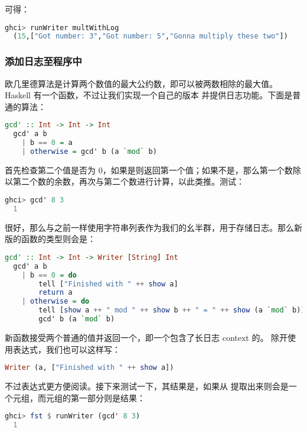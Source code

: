 \documentclass[./main.tex]{subfiles}
\begin{document}
可得：

\begin{lstlisting}[language=Haskell]
  ghci> runWriter multWithLog
  (15,["Got number: 3","Got number: 5","Gonna multiply these two"])
\end{lstlisting}

\subsubsection*{添加日志至程序中}

欧几里德算法是计算两个数值的最大公约数，即可以被两数相除的最大值。Haskell 有一个函数，不过让我们实现一个自己的版本
并提供日志功能。下面是普通的算法：

\begin{lstlisting}[language=Haskell]
  gcd' :: Int -> Int -> Int
  gcd' a b
    | b == 0 = a
    | otherwise = gcd' b (a `mod` b)
\end{lstlisting}

首先检查第二个值是否为 0，如果是则返回第一个值；如果不是，那么第一个数除以第二个数的余数，再次与第二个数进行计算，以此类推。测试：

\begin{lstlisting}[language=Haskell]
  ghci> gcd' 8 3
  1
\end{lstlisting}

很好，那么与之前一样使用字符串列表作为我们的幺半群，用于存储日志。那么新版的函数的类型则会是：

\begin{lstlisting}[language=Haskell]
  gcd' :: Int -> Int -> Writer [String] Int
  gcd' a b
    | b == 0 = do
        tell ["Finished with " ++ show a]
        return a
    | otherwise = do
        tell [show a ++ " mod " ++ show b ++ " = " ++ show (a `mod` b)]
        gcd' b (a `mod` b)
\end{lstlisting}

新函数接受两个普通的值并返回一个，即一个包含了长日志 context 的。
除开使用表达式，我们也可以这样写：

\begin{lstlisting}[language=Haskell]
  Writer (a, ["Finished with " ++ show a])
\end{lstlisting}

不过表达式更方便阅读。接下来测试一下，其结果是，如果从
提取出来则会是一个元组，而元组的第一部分则是结果：

\begin{lstlisting}[language=Haskell]
  ghci> fst $ runWriter (gcd' 8 3)
  1
\end{lstlisting}
\end{document}
